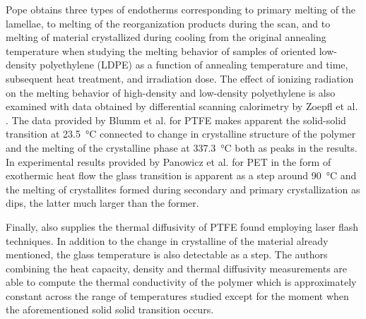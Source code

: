 Pope \citep{popeCharacterizationOrientedLowdensity1976} obtains three types of endotherms corresponding to primary melting of the lamellae, to melting of the reorganization products during the scan, and to melting of material crystallized during cooling from the original annealing temperature when studying the melting behavior of samples of oriented low-density polyethylene (LDPE) as a function of annealing temperature and time, subsequent heat treatment, and irradiation dose.
The effect of ionizing radiation on the melting behavior of high-density and low-density
polyethylene is also examined with data obtained by differential scanning calorimetry by Zoepfl et al. \citep{zoepflDifferentialScanningCalorimetry1984}.
The data provided by Blumm et al. \citep{blummCharacterizationPTFEUsing2010} for PTFE makes apparent the solid-solid transition at \SI{23.5}{\celsius} connected to change in crystalline structure of the polymer and the melting of the crystalline phase at \SI{337.3}{\celsius} both as peaks in the results.
In experimental results provided by Panowicz et al. \citep{panowiczPropertiesPolyethyleneTerephthalate2021} for PET in the form of exothermic heat flow the glass transition is apparent as a step around \SI{90}{\celsius} and the melting of crystallites formed during secondary and primary crystallization as dips, the latter much larger than the former.

Finally, \cite{blummCharacterizationPTFEUsing2010} also supplies the thermal diffusivity of PTFE found employing laser flash techniques.
In addition to the change in crystalline of the material already mentioned, the glass temperature is also detectable as a step.
The authors combining the heat capacity, density and thermal diffusivity measurements are able to compute the thermal conductivity of the polymer which is approximately constant across the range of temperatures studied except for the moment when the aforementioned solid solid transition occurs.
